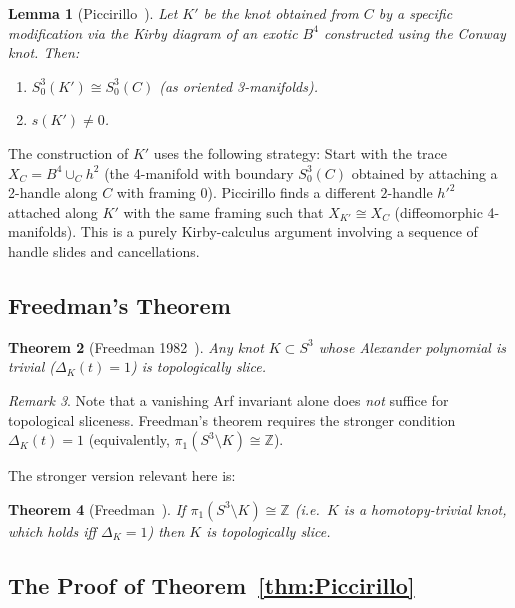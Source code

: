 \documentclass[12pt,a4paper]{amsart}
\newtheorem{theorem}{Theorem}[section]
\newtheorem{lemma}[theorem]{Lemma}
\theoremstyle{definition}
\theoremstyle{remark}
\newtheorem{remark}[theorem]{Remark}
\newcommand{\Z}{\mathbb{Z}}
\begin{document}
\begin{lemma}[Piccirillo~\cite{Piccirillo2020}]
\label{lem:Piccirillo}
Let $K'$ be the knot obtained from $C$ by a specific modification
via the Kirby diagram of an exotic $B^4$ constructed using the Conway
knot. Then:
\begin{enumerate}[label=\roman*)]
\item $S^3_0(K') \cong S^3_0(C)$ (as oriented 3-manifolds).
\item $s(K') \neq 0$.
\end{enumerate}
\end{lemma}

The construction of $K'$ uses the following strategy:
Start with the trace $X_C = B^4 \cup_C h^2$ (the 4-manifold with boundary
$S^3_0(C)$ obtained by attaching a 2-handle along $C$ with framing 0).
Piccirillo finds a different $2$-handle $h'^2$ attached along $K'$
with the same framing such that $X_{K'} \cong X_C$ (diffeomorphic
4-manifolds). This is a purely Kirby-calculus argument involving
a sequence of handle slides and cancellations.

\subsection{Freedman's Theorem}

\begin{theorem}[Freedman 1982~\cite{Freedman1982}]
Any knot $K \subset S^3$ whose Alexander polynomial is trivial
($\Delta_K(t) = 1$) is topologically slice.
\end{theorem}

\begin{remark}
Note that a vanishing Arf invariant alone does \emph{not} suffice for
topological sliceness. Freedman's theorem requires the stronger condition
$\Delta_K(t) = 1$ (equivalently, $\pi_1(S^3 \setminus K) \cong \Z$).
\end{remark}

The stronger version relevant here is:

\begin{theorem}[Freedman~\cite{Freedman1982}]
If $\pi_1(S^3 \setminus K) \cong \Z$ (i.e.\ $K$ is a homotopy-trivial
knot, which holds iff $\Delta_K = 1$) then $K$ is topologically slice.
\end{theorem}

\subsection{The Proof of Theorem~\ref{thm:Piccirillo}}
\end{document}
